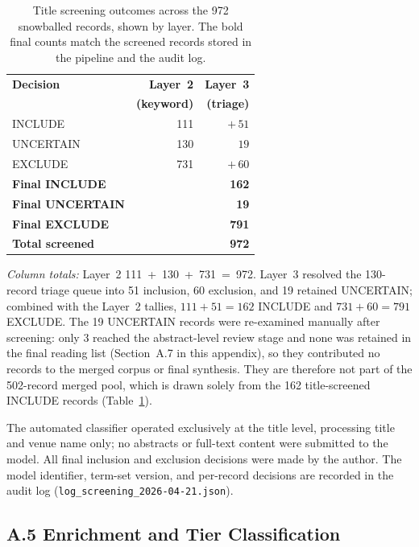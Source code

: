 \begin{table}[H]
\centering
\caption{Title screening outcomes across the 972 snowballed records, shown by
layer. The bold final counts match the screened records stored in the pipeline
and the audit log.}
\label{tab:screening}
\begin{tabular}{lrr}
\toprule
\textbf{Decision} & \textbf{Layer~2} & \textbf{Layer~3} \\
 & \textbf{(keyword)} & \textbf{(triage)} \\
\midrule
INCLUDE           & 111 & ${+}\,51$ \\
UNCERTAIN         & 130 & $\phantom{+}19$ \\
EXCLUDE           & 731 & ${+}\,60$ \\
\midrule
\textbf{Final INCLUDE}   & \multicolumn{2}{r}{\textbf{162}} \\
\textbf{Final UNCERTAIN} & \multicolumn{2}{r}{\textbf{19}} \\
\textbf{Final EXCLUDE}   & \multicolumn{2}{r}{\textbf{791}} \\
\midrule
\textbf{Total screened}  & \multicolumn{2}{r}{\textbf{972}} \\
\bottomrule
\end{tabular}
\end{table}
\vspace*{-2pt}
\emph{Column totals:} Layer~2 \mbox{111 + 130 + 731 = 972}. Layer~3 resolved
the 130-record triage queue into 51 inclusion, 60 exclusion, and 19 retained
UNCERTAIN; combined with the Layer~2 tallies, $111{+}51{=}162$ INCLUDE and
$731{+}60{=}791$ EXCLUDE. The 19 UNCERTAIN records were re-examined manually after screening: only 3
reached the abstract-level review stage and none was retained in the final
reading list (Section~A.7 in this appendix), so they contributed no records
to the merged corpus or final synthesis. They are therefore not part of the
502-record merged pool, which is drawn solely from the 162 title-screened
INCLUDE records (Table~\ref{tab:screening}).

The automated classifier operated exclusively at the title level, processing
title and venue name only; no abstracts or full-text content were submitted
to the model. All final inclusion and exclusion decisions were made by the
author. The model identifier, term-set version, and per-record decisions are
recorded in the audit log (\texttt{log\_screening\_2026-04-21.json}).

\subsection*{A.5 Enrichment and Tier Classification}

